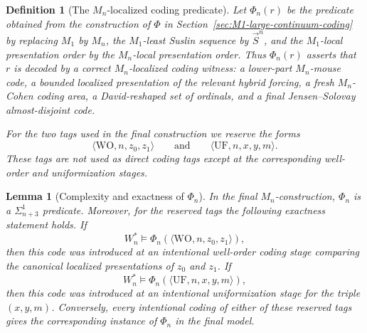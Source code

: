 \documentclass[a4paper,11pt]{article}
\newtheorem{lemma}[theorem]{Lemma}
\newtheorem{definition}[theorem]{Definition}
\begin{document}
\begin{definition}[The $M_n$-localized coding predicate]\label{def:mn-localized-coding-predicate}
Let $\Phi_n(r)$ be the predicate obtained from the construction of $\Phi$ in Section~\ref{sec:M1-large-continuum-coding} by replacing $M_1$ by $M_n$, the $M_1$-least Suslin sequence by $\vec S^n$, and the $M_1$-local presentation order by the $M_n$-local presentation order.  Thus $\Phi_n(r)$ asserts that $r$ is decoded by a correct $M_n$-localized coding witness: a lower-part $M_n$-mouse code, a bounded localized presentation of the relevant hybrid forcing, a fresh $M_n$-Cohen coding area, a David-reshaped set of ordinals, and a final Jensen--Solovay almost-disjoint code.

For the two tags used in the final construction we reserve the forms
\[
   \langle\mathrm{WO},n,z_0,z_1\rangle
   \qquad\text{and}\qquad
   \langle\mathrm{UF},n,x,y,m\rangle .
\]
These tags are not used as direct coding tags except at the corresponding well-order and uniformization stages.
\end{definition}

\begin{lemma}[Complexity and exactness of $\Phi_n$]\label{lem:mn-coding-complexity-exactness}
In the final $M_n$-construction, $\Phi_n$ is a $\Sigma^1_{n+3}$ predicate.  Moreover, for the reserved tags the following exactness statement holds.  If
\[
   W_n^\ast\models \Phi_n(\langle\mathrm{WO},n,z_0,z_1\rangle),
\]
then this code was introduced at an intentional well-order coding stage comparing the canonical localized presentations of $z_0$ and $z_1$.  If
\[
   W_n^\ast\models \Phi_n(\langle\mathrm{UF},n,x,y,m\rangle),
\]
then this code was introduced at an intentional uniformization stage for the triple $(x,y,m)$.  Conversely, every intentional coding of either of these reserved tags gives the corresponding instance of $\Phi_n$ in the final model.
\end{lemma}
\end{document}
